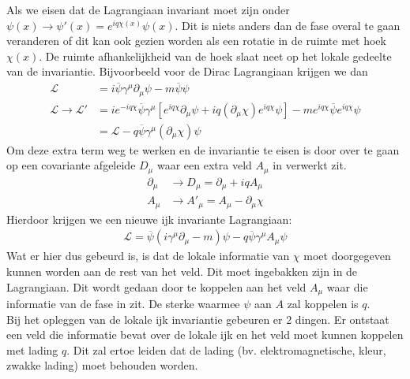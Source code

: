 \documentclass[../main.tex]{subfiles}
\begin{document}
Als we eisen dat de Lagrangiaan invariant moet zijn onder $\psi(x) \rightarrow \psi'(x) = e^{iq\chi(x)}\psi(x)$. Dit is niets anders dan de fase overal te gaan veranderen of dit kan ook gezien worden als een rotatie in de ruimte met hoek $\chi(x)$. De ruimte afhankelijkheid van de hoek slaat neet op het lokale gedeelte van de invariantie. Bijvoorbeeld voor de Dirac Lagrangiaan krijgen we dan
\begin{equation}
    \begin{aligned}
        \label{eq:lok_ijk_inv_dir_1}
        \mathcal{L} &= i\overline \psi \gamma^\mu \partial_\mu \psi - m \overline \psi\psi\\
        \mathcal{L} \rightarrow \mathcal{L}' &= i e^{-iq\chi} \overline \psi \gamma^\mu [e^{iq\chi}\partial_\mu \psi + iq(\partial_\mu\chi) e^{iq\chi}\psi] - m e^{iq\chi} \overline \psi e^{iq\chi}\psi\\
                                             &=\mathcal{L} - q\overline \psi \gamma^\mu (\partial_\mu \chi)\psi
    \end{aligned}
\end{equation}
Om deze extra term weg te werken en de invariantie te eisen is door over te gaan op een covariante afgeleide $D_\mu$ waar een extra veld $A_\mu$ in verwerkt zit.
\begin{equation}
    \begin{aligned}
        \label{eq:cov_afgeleide}
        \partial_\mu &\rightarrow D_\mu = \partial_\mu + iqA_\mu\\
        A_\mu &\rightarrow A'_\mu = A_\mu - \partial_\mu \chi
    \end{aligned}
\end{equation}
Hierdoor krijgen we een nieuwe ijk invariante Lagrangiaan:
\begin{equation}
    \begin{aligned}
        \label{eq:lok_ijk_inv_dir_2}
        \mathcal{L} = \overline \psi (i\gamma^\mu \partial_\mu - m)\psi - q\overline\psi\gamma^\mu A_\mu\psi
    \end{aligned}
\end{equation}
Wat er hier dus gebeurd is, is dat de lokale informatie van $\chi$ moet doorgegeven kunnen worden aan de rest van het veld. Dit moet ingebakken zijn in de Lagrangiaan. Dit wordt gedaan door te koppelen aan het veld $A_\mu$ waar die informatie van de fase in zit. De sterke waarmee $\psi$ aan $A$ zal koppelen is $q$.\\
Bij het opleggen van de lokale ijk invariantie gebeuren er 2 dingen. Er ontstaat een veld die informatie bevat over de lokale ijk en het veld moet kunnen koppelen met lading $q$. Dit zal ertoe leiden dat de lading (bv. elektromagnetische, kleur, zwakke lading) moet behouden worden.\\ 
\end{document}
